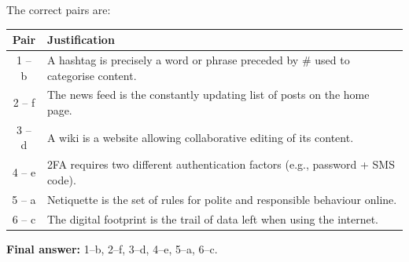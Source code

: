 \documentclass[11pt]{article}
\begin{document}
\begin{corrige}
The correct pairs are:
\begin{center}
\begin{tabular}{|c|l|}\hline
\rowcolor{popblueL} \textbf{Pair} & \textbf{Justification} \\ \hline
1 -- b & A hashtag is precisely a word or phrase preceded by \# used to categorise content. \\ \hline
2 -- f & The news feed is the constantly updating list of posts on the home page. \\ \hline
3 -- d & A wiki is a website allowing collaborative editing of its content. \\ \hline
4 -- e & 2FA requires two different authentication factors (e.g., password + SMS code). \\ \hline
5 -- a & Netiquette is the set of rules for polite and responsible behaviour online. \\ \hline
6 -- c & The digital footprint is the trail of data left when using the internet. \\ \hline
\end{tabular}
\end{center}
\textbf{Final answer:} 1--b, 2--f, 3--d, 4--e, 5--a, 6--c.
\end{corrige}
\end{document}
